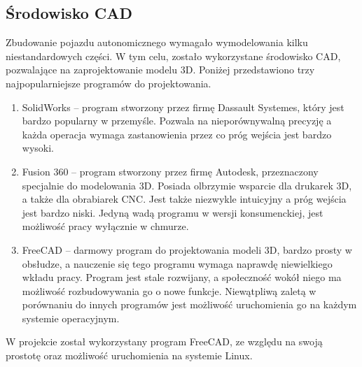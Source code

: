     \subsection{Środowisko CAD}
        Zbudowanie pojazdu autonomicznego wymagało wymodelowania kilku niestandardowych części.
        W tym celu, zostało wykorzystane środowisko CAD, pozwalające na zaprojektowanie modelu 3D.
        Poniżej przedstawiono trzy najpopularniejsze programów do projektowania.
        \begin{enumerate}
            \item SolidWorks -- program stworzony przez firmę Dassault Systemes, który jest bardzo popularny w przemyśle.
            Pozwala na nieporównywalną precyzję a każda operacja wymaga zastanowienia przez co próg wejścia jest bardzo wysoki.
            \item Fusion 360 -- program stworzony przez firmę Autodesk, przeznaczony specjalnie do modelowania 3D.
            Posiada olbrzymie wsparcie dla drukarek 3D, a także dla obrabiarek CNC.
            Jest także niezwykle intuicyjny a próg wejścia jest bardzo niski.
            Jedyną wadą programu w wersji konsumenckiej, jest możliwość pracy wyłącznie w chmurze.
            \item FreeCAD -- darmowy program do projektowania modeli 3D, bardzo prosty w obsłudze, a nauczenie się tego programu wymaga naprawdę niewielkiego wkładu pracy.
            Program jest stale rozwijany, a społeczność wokół niego ma możliwość rozbudowywania go o nowe funkcje.
            Niewątpliwą zaletą w porównaniu do innych programów jest możliwość uruchomienia go na każdym systemie operacyjnym.
        \end{enumerate}

        W projekcie został wykorzystany program FreeCAD, ze względu na swoją prostotę oraz możliwość uruchomienia na systemie Linux.

